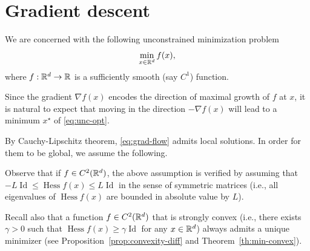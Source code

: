      \section{Gradient descent}
 
     We are concerned with the following unconstrained minimization problem
     \begin{equation}
         \label{eq:unc-opt}
         \min_{x\in\mathbb{R}^d} f(x),
     \end{equation}
     where $f:\mathbb{R}^d\to \mathbb{R}$ is a sufficiently smooth (say $C^1$) function.
 
     Since the gradient $\nabla f(x)$ encodes the direction of maximal growth of $f$ at $x$, it is natural to expect that moving in the direction $-\nabla f(x)$ will lead to a minimum $x^\star$ of \eqref{eq:unc-opt}.
 
 
     By Cauchy-Lipschitz theorem, \eqref{eq:grad-flow} admits local solutions.
     In order for them to be global, we assume the following.
 
 
     Observe that if $f\in C^2(\mathbb{R}^d)$, the above assumption is verified by assuming that $-L\operatorname{Id}\le \operatorname{Hess} f(x)\le L \operatorname{Id}$ in the sense of symmetric matrices (i.e.,  all eigenvalues of $\operatorname{Hess}f(x)$ are bounded in absolute value by $L$).
 
     Recall also that a function $f\in C^2(\mathbb{R}^d)$ that is strongly convex (i.e., there exists $\gamma>0$ such that $\operatorname{Hess}f(x)\ge \gamma\operatorname{Id}$ for any $x\in \mathbb{R}^d$) always admits a unique minimizer (see Proposition~\ref{prop:convexity-diff} and Theorem~\ref{th:min-convex}).
 
